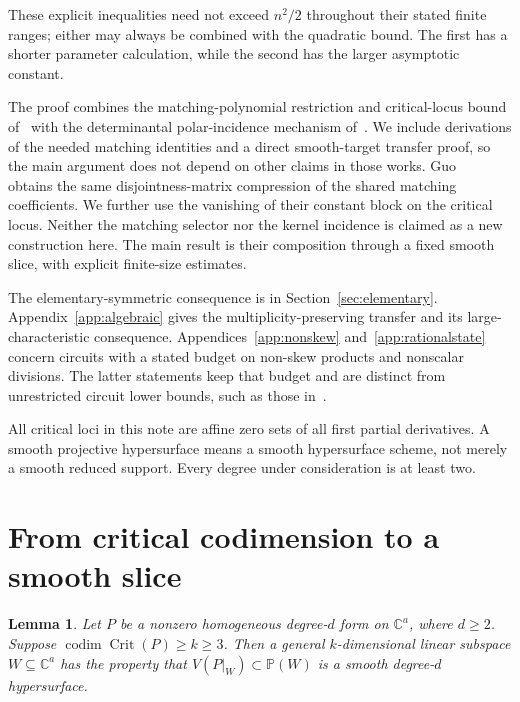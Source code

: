 \documentclass[11pt]{article}
\newtheorem{lemma}[theorem]{Lemma}
\theoremstyle{remark}\newtheorem{remark}[theorem]{Remark}
\DeclareMathOperator{\Crit}{Crit}
\DeclareMathOperator{\codim}{codim}
\newcommand{\C}{\mathbb C}
\newcommand{\PP}{\mathbb P}
\begin{document}
These explicit inequalities need not exceed $n^2/2$ throughout their
stated finite ranges; either may always be combined with the quadratic
bound. The first has a shorter parameter calculation, while the second
has the larger asymptotic constant.

The proof combines the matching-polynomial restriction and critical-locus
bound of~\cite[Chapter 5, Proposition 5.1 and Lemma 6.1]{OAI} with the
determinantal polar-incidence mechanism of~\cite[Theorem 1.3]{Sheshadri}.
We include derivations of the needed matching identities and a direct
smooth-target transfer proof, so the main argument does not depend on
other claims in those works. Guo~\cite[Proposition 3.1]{Guo} obtains the
same disjointness-matrix compression of the shared matching coefficients.
We further use the vanishing of their constant block on the critical
locus. Neither the matching selector nor the kernel incidence is claimed
as a new construction here. The main result is their composition through
a fixed smooth slice, with explicit finite-size estimates.

The elementary-symmetric consequence is in Section~\ref{sec:elementary}.
Appendix~\ref{app:algebraic} gives the multiplicity-preserving transfer
and its large-characteristic consequence. Appendices~\ref{app:nonskew}
and~\ref{app:rationalstate} concern circuits with a stated budget on
non-skew products and nonscalar divisions. The latter statements keep
that budget and are distinct from unrestricted circuit lower bounds,
such as those in~\cite{OAI,Guo}.

All critical loci in this note are affine zero sets of all first
partial derivatives. A smooth projective hypersurface means a smooth
hypersurface scheme, not merely a smooth reduced support. Every degree
under consideration is at least two.

\section{From critical codimension to a smooth slice}

\begin{lemma}\label{lem:slice}
Let $P$ be a nonzero homogeneous degree-$d$ form on $\C^a$, where
$d\ge2$. Suppose $\codim\Crit(P)\ge k\ge3$. Then a general $k$-dimensional
linear subspace $W\subseteq\C^a$ has the property that
$V(P|_W)\subset\PP(W)$ is a smooth degree-$d$ hypersurface.
\end{lemma}
\end{document}
